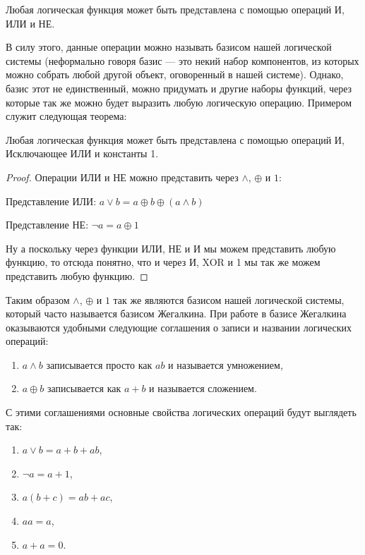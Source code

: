 \begin{thm}Любая логическая функция может быть представлена с помощью операций И, ИЛИ и НЕ.\end{thm}

В силу этого, данные операции можно называть базисом нашей логической системы (неформально говоря базис — это некий набор компонентов, из которых можно собрать любой другой объект, оговоренный в нашей системе). Однако, базис этот не единственный, можно придумать и другие наборы функций, через которые так же можно будет выразить любую логическую операцию. Примером служит следующая теорема:

\begin{thm}Любая логическая функция может быть представлена с помощью операций И, Исключающее ИЛИ и константы 1.\end{thm}

\begin{proof}Операции ИЛИ и НЕ можно представить через $\land$, $\oplus$ и $1$:

Представление ИЛИ: $a\lor b = a \oplus b \oplus (a\land b)$

Представление НЕ: $\neg a = a \oplus 1$

Ну а поскольку через функции ИЛИ, НЕ и И мы можем представить любую функцию, то отсюда понятно, что и через И, XOR и 1 мы так же можем представить любую функцию.\end{proof}

Таким образом $\land$, $\oplus$ и $1$ так же являются базисом нашей логической системы, который часто называется базисом Жегалкина. При работе в базисе Жегалкина оказываются удобными следующие соглашения о записи и названии логических операций:

\begin{enumerate}
\item $a\land b$ записывается просто как $ab$ и называется умножением,
\item $a \oplus b$ записывается как $a + b$ и называется сложением.
\end{enumerate}

С этими соглашениями основные свойства логических операций будут выглядеть так:

\begin{enumerate}
\item $a\lor b=a + b +ab$,
\item $\neg a = a + 1$,
\item $a(b+c) = ab + ac$,
\item $aa = a$,
\item $a + a = 0$.
\end{enumerate}

